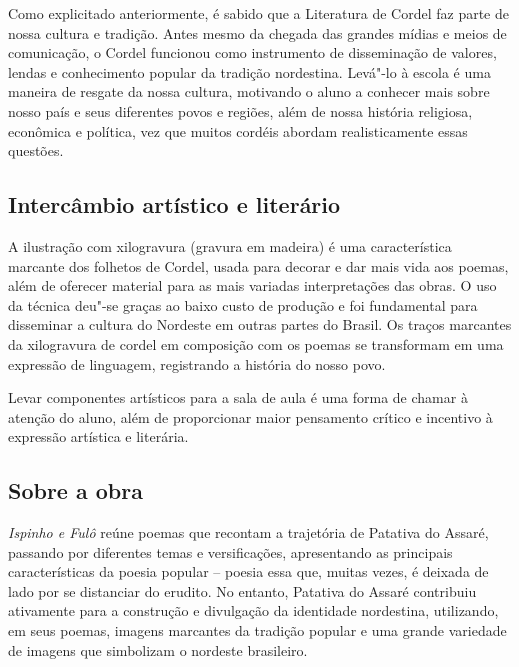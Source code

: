 \documentclass[12pt]{extarticle}
\begin{document}
Como explicitado anteriormente, é sabido que a Literatura de Cordel faz
parte de nossa cultura e tradição. Antes mesmo da chegada das grandes
mídias e meios de comunicação, o Cordel funcionou como instrumento de
disseminação de valores, lendas e conhecimento popular da tradição
nordestina. Levá"-lo à escola é uma maneira de resgate da nossa cultura,
motivando o aluno a conhecer mais sobre nosso país e seus diferentes
povos e regiões, além de nossa história religiosa, econômica e política,
vez que muitos cordéis abordam realisticamente essas questões.

\subsection{Intercâmbio artístico e literário}

A ilustração com xilogravura (gravura em madeira) é uma característica
marcante dos folhetos de Cordel, usada para decorar e dar mais vida aos
poemas, além de oferecer material para as mais variadas interpretações
das obras. O uso da técnica deu"-se graças ao baixo custo de produção e
foi fundamental para disseminar a cultura do Nordeste em outras partes
do Brasil. Os traços marcantes da xilogravura de cordel em composição
com os poemas se transformam em uma expressão de linguagem, registrando
a história do nosso povo.

Levar componentes artísticos para a sala de aula é uma forma de chamar à
atenção do aluno, além de proporcionar maior pensamento crítico e
incentivo à expressão artística e literária.


\subsection{Sobre a obra }

\emph{Ispinho e Fulô} reúne poemas que recontam a trajetória de Patativa
do Assaré, passando por diferentes temas e versificações, apresentando
as principais características da poesia popular -- poesia essa que,
muitas vezes, é deixada de lado por se distanciar do erudito. No
entanto, Patativa do Assaré contribuiu ativamente para a construção e
divulgação da identidade nordestina, utilizando, em seus poemas, imagens
marcantes da tradição popular e uma grande variedade de imagens que
simbolizam o nordeste brasileiro.
\end{document}
